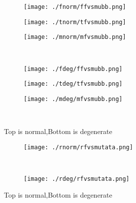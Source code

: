 \documentclass[aps,floats,floatfix,nofootinbib]{revtex4-1}
\begin{document}
\begin{center}
\begin{figure}
\begin{subfigure}{0.3\textwidth}
\texttt{[image: ./fnorm/ffvsmubb.png]}
\label{}
\end{subfigure}
\begin{subfigure}{0.3\textwidth}
\texttt{[image: ./tnorm/tfvsmubb.png]}
\label{}
\end{subfigure}
\begin{subfigure}{0.3\textwidth}
\texttt{[image: ./mnorm/mfvsmubb.png]}
\label{}
\end{subfigure}\\
\begin{subfigure}{0.3\textwidth}
\texttt{[image: ./fdeg/ffvsmubb.png]}
\label{}
\end{subfigure}
\begin{subfigure}{0.3\textwidth}
\texttt{[image: ./tdeg/tfvsmubb.png]}
\label{}
\end{subfigure}
\begin{subfigure}{0.3\textwidth}
\texttt{[image: ./mdeg/mfvsmubb.png]}
\label{}
\end{subfigure}\\
\caption{Top is normal,Bottom is degenerate}
\end{figure}
\end{center}

\begin{center}
\begin{figure}
\begin{subfigure}{1.0\textwidth}
\texttt{[image: ./rnorm/rfvsmutata.png]}
\label{}
\end{subfigure}\\
\begin{subfigure}{1.0\textwidth}
\texttt{[image: ./rdeg/rfvsmutata.png]}
\label{}
\end{subfigure}
\caption{Top is normal,Bottom is degenerate}
\end{figure}
\end{center}
\end{document}
